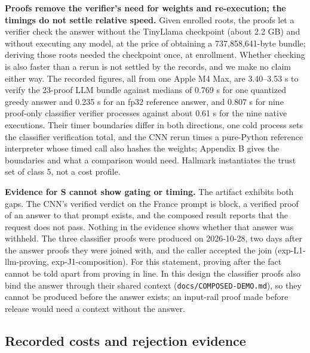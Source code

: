 \documentclass[11pt]{article}
\begin{document}
\textbf{Proofs remove the verifier's need for weights and re-execution; the timings do not settle relative speed.} Given enrolled roots, the proofs let a verifier check the answer without the TinyLlama checkpoint (about 2.2 GB) and without executing any model, at the price of obtaining a 737,858,641-byte bundle; deriving those roots needed the checkpoint once, at enrollment. Whether checking is also faster than a rerun is not settled by the records, and we make no claim either way. The recorded figures, all from one Apple M4 Max, are 3.40--3.53 s to verify the 23-proof LLM bundle against medians of 0.769 s for one quantized greedy answer and 0.235 s for an fp32 reference answer, and 0.807 s for nine proof-only classifier verifier processes against about 0.61 s for the nine native executions. Their timer boundaries differ in both directions, one cold process sets the classifier verification total, and the CNN rerun times a pure-Python reference interpreter whose timed call also hashes the weights; Appendix B gives the boundaries and what a comparison would need. Hallmark instantiates the trust set of class 5, not a cost profile.

\textbf{Evidence for S cannot show gating or timing.} The artifact exhibits both gaps. The CNN's verified verdict on the France prompt is block, a verified proof of an answer to that prompt exists, and the composed result reports that the request does not pass. Nothing in the evidence shows whether that answer was withheld. The three classifier proofs were produced on 2026-10-28, two days after the answer proofs they were joined with, and the caller accepted the join (exp-L1-llm-proving, exp-J1-composition). For this statement, proving after the fact cannot be told apart from proving in line. In this design the classifier proofs also bind the answer through their shared context (\texttt{docs/\allowbreak{}COMPOSED-\allowbreak{}DEMO.\allowbreak{}md}), so they cannot be produced before the answer exists; an input-rail proof made before release would need a context without the answer.

\subsection{Recorded costs and rejection evidence}
\end{document}
